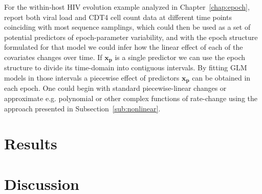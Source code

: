 For the within-host HIV evolution example analyzed in Chapter~\ref{chap:epoch}, \citet{Shankarappa1999} report both viral load and CDT4 cell count data at different time points coinciding with most sequence samplings, which could then be used as a set of potential predictors of epoch-parameter variability, and with the epoch structure %
formulated 
for that model we could infer how the linear effect of each of the covariates changes over time.
If $\mathbf{x_{p}}$ is a single predictor we can use the epoch structure to divide its time-domain into contiguous intervals.
By fitting GLM models in those intervals a piecewise effect of predictors $\mathbf{x_{p}}$ can be obtained in each epoch. 
One could begin with standard piecewise-linear changes or approximate e.g. polynomial or other complex functions of rate-change using the approach presented in Subsection~\ref{sub:nonlinear}.




\section{Results}


\section{Discussion}


